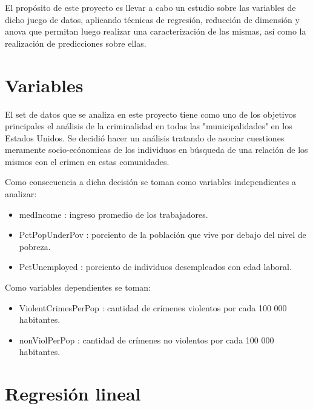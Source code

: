 \documentclass[a4paper,10pt,twocolumn]{article}
\begin{document}
	El propósito de este proyecto es llevar a cabo un estudio sobre las variables de dicho juego de datos, aplicando técnicas de regresión, reducción de dimensión y anova que permitan luego realizar una caracterización de las mismas, así como la realización de predicciones sobre ellas.



\section{Variables}\label{sec:ex1.0}
El set de datos que se analiza en este proyecto tiene como uno de los objetivos principales el análisis de la criminalidad en todas las "municipalidades" en los Estados Unidos. Se decidió hacer un análisis tratando de asociar cuestiones meramente socio-ecónomicas de los individuos en búsqueda de una relación de los mismos con el crimen en estas comunidades.

 Como consecuencia a dicha decisión se toman como variables independientes a analizar:
 \begin{itemize}
	 \item medIncome : ingreso promedio de los trabajadores.
	 \item PctPopUnderPov : porciento de la población que vive por debajo del nivel de pobreza.
	 \item PctUnemployed : porciento de individuos desempleados con edad laboral.	 
 \end{itemize}

 Como variables dependientes se toman:
 \begin{itemize}
	 \item ViolentCrimesPerPop : cantidad de crímenes violentos por cada 100 000 habitantes.
	 \item nonViolPerPop : cantidad de crímenes no violentos por cada 100 000 habitantes.
 \end{itemize}
\section{Regresión lineal}\label{sec:ex1.1}
	
\end{document}
